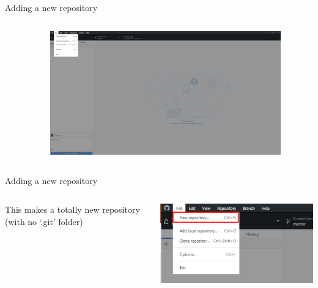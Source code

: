 \documentclass[10pt]{beamer}
\begin{document}
{\begin{frame}[fragile]{Adding a new repository}
\begin{columns}[T]
\begin{column}{.12\textwidth}
\end{column}
\begin{column}{.88\textwidth}
\includegraphics[width=10cm]{Figs/GHD/outline_01}
\end{column}
\end{columns}
\end{frame}


\begin{frame}[fragile]{Adding a new repository}
\begin{columns}[T]
\begin{column}{.12\textwidth}
\small This makes a totally new repository (with no `.git' folder)
\end{column}
\begin{column}{.88\textwidth}
\includegraphics[width=10cm]{Figs/GHD/menu_02}
\end{column}
\end{columns}
\end{frame}

}
\end{document}
